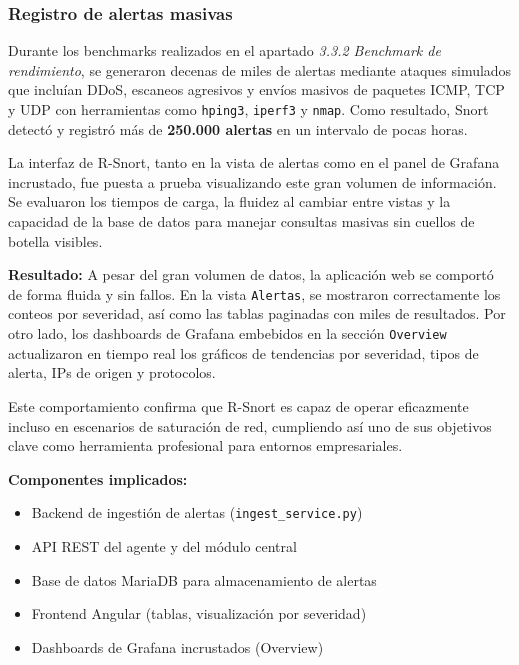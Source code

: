 \documentclass[11pt,a4paper,twoside]{report}
\begin{document}
\subsubsection{Registro de alertas masivas}

Durante los benchmarks realizados en el apartado \textit{3.3.2 Benchmark de rendimiento}, se generaron decenas de miles de alertas mediante ataques simulados que incluían DDoS, escaneos agresivos y envíos masivos de paquetes ICMP, TCP y UDP con herramientas como \texttt{hping3}, \texttt{iperf3} y \texttt{nmap}. Como resultado, Snort detectó y registró más de \textbf{250.000 alertas} en un intervalo de pocas horas.\newline

La interfaz de R-Snort, tanto en la vista de alertas como en el panel de Grafana incrustado, fue puesta a prueba visualizando este gran volumen de información. Se evaluaron los tiempos de carga, la fluidez al cambiar entre vistas y la capacidad de la base de datos para manejar consultas masivas sin cuellos de botella visibles.\newline

\textbf{Resultado:}  
A pesar del gran volumen de datos, la aplicación web se comportó de forma fluida y sin fallos. En la vista \texttt{Alertas}, se mostraron correctamente los conteos por severidad, así como las tablas paginadas con miles de resultados. Por otro lado, los dashboards de Grafana embebidos en la sección \texttt{Overview} actualizaron en tiempo real los gráficos de tendencias por severidad, tipos de alerta, IPs de origen y protocolos.\newline

Este comportamiento confirma que R-Snort es capaz de operar eficazmente incluso en escenarios de saturación de red, cumpliendo así uno de sus objetivos clave como herramienta profesional para entornos empresariales.

\textbf{Componentes implicados:}
\begin{itemize}
	\item Backend de ingestión de alertas (\texttt{ingest\_service.py})
	\item API REST del agente y del módulo central
	\item Base de datos MariaDB para almacenamiento de alertas
	\item Frontend Angular (tablas, visualización por severidad)
	\item Dashboards de Grafana incrustados (Overview)
\end{itemize}
\end{document}
